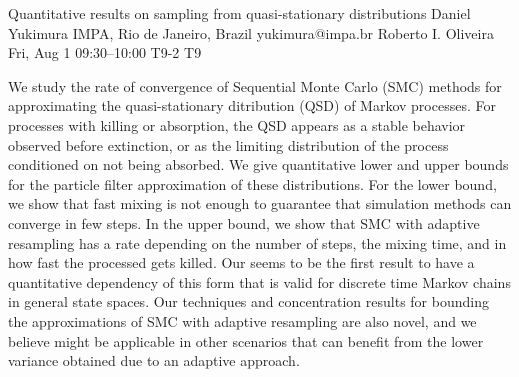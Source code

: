 \begin{talk}
  {Quantitative results on sampling from quasi-stationary distributions}%
  {Daniel Yukimura}%
  {IMPA, Rio de Janeiro, Brazil}%
  {yukimura@impa.br}%
  {Roberto I. Oliveira}%
  {}%
  {Fri, Aug 1 09:30–10:00}%
  {T9-2}%
  {T9}%
  
				
			
    We study the rate of convergence of Sequential Monte Carlo (SMC) methods for approximating the quasi-stationary ditribution (QSD) of Markov processes. 
    For processes with killing or absorption, the QSD appears as a stable behavior observed before extinction, or as the limiting distribution of the process conditioned on not being absorbed. 
    We give quantitative lower and upper bounds for the particle filter approximation of these distributions.
    For the lower bound, we show that fast mixing is not enough to guarantee that simulation methods can converge in few steps.
    In the upper bound, we show that SMC with adaptive resampling has a rate depending on the number of steps, the mixing time, and in how fast the processed gets killed.
    Our seems to be the first result to have a quantitative dependency of this form that is valid for discrete time Markov chains in general state spaces.
    Our techniques and concentration results for bounding the approximations of SMC with adaptive resampling are also novel, and we believe might be applicable in other scenarios that can benefit from the lower variance obtained due to an adaptive approach.
    
    

\medskip


\end{talk}

